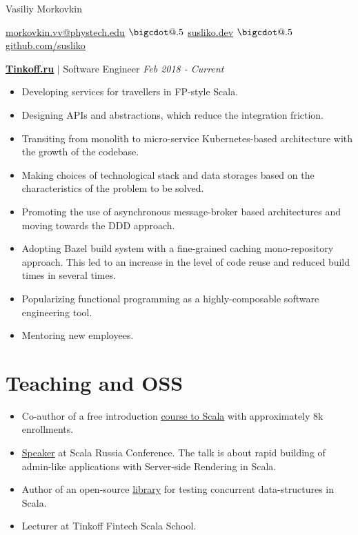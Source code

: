 \documentclass[paper=a4,fontsize=15pt]{scrartcl}
\makeatletter
\newcommand*\bigcdot{\mathpalette\bigcdot@{.5}}
\newcommand*\bigcdot@[2]{\mathbin{\vcenter{\hbox{\scalebox{#2}{$\m@th#1\bullet$}}}}}
\newcommand{\smolboispace}{\vspace*{0.1em}}
\newcommand{\halfspace}{\vspace*{0.5em}}
\newcommand{\bighalfspace}{\vspace*{0.75em}}
\newcommand{\http}[1]{\href{http://#1}{\ul{#1}}}
\newcommand{\https}[1]{\href{https://#1}{\ul{#1}}}
\newcommand{\email}[1]{\href{mailto:#1}{\ul{#1}}}
\makeatother
\begin{document}
\begin{center}
  {\fontsize{35}{40}\selectfont Vasiliy Morkovkin \par}
  \halfspace
  \smolboispace
  \smolboispace

  {\normalsize
    \email{morkovkin.vv@phystech.edu}
    $\bigcdot$ \http{susliko.dev}
    $\bigcdot$ \https{github.com/susliko}
    \par}
\end{center}

\bighalfspace
\normalsize
\noindent \href{https://www.tinkoff.ru}{\textbf{\ul{Tinkoff.ru}}}
$\vert$ \small Software Engineer
{\hfill \footnotesize \textit{Feb 2018 - Current}}
\begin{itemize}[noitemsep,leftmargin=20pt,label=\raisebox{0.25ex}{\tiny$\bullet$},topsep=5pt]
  \small
  \item Developing services for travellers in FP-style Scala.
  \item Designing APIs and abstractions, which reduce the integration friction.
  \item Transiting from monolith to micro-service Kubernetes-based architecture with the growth of the codebase.
  \item Making choices of technological stack and data storages based on the characteristics of the problem to be solved. 
  \item Promoting the use of asynchronous message-broker based architectures and moving towards the DDD approach.
  \item Adopting Bazel build system with a fine-grained caching mono-repository approach. This led to an increase in the level of code reuse and reduced build times in several times.
  \item Popularizing functional programming as a highly-composable software engineering tool.
  \item Mentoring new employees.
\end{itemize}

\section*{Teaching and OSS}{}
\begin{itemize}[noitemsep,leftmargin=20pt,label=\raisebox{0.25ex}{\tiny$\bullet$},topsep=5pt]
  \item Co-author of a free introduction \href{https://stepik.org/course/16243}{\ul{course to Scala}} with approximately 8k enrollments.
  \item \href{https://www.youtube.com/watch?v=8KxWi0xuDKs&t=15s}{\ul{Speaker}} at Scala Russia Conference. The talk is about rapid building of admin-like applications with Server-side Rendering in Scala.
  \item Author of an open-source \href{https://github.com/susliko/lotos}{\ul{library}} for testing concurrent data-structures in Scala.
  \item Lecturer at Tinkoff Fintech Scala School.
\end{itemize}
\end{document}
